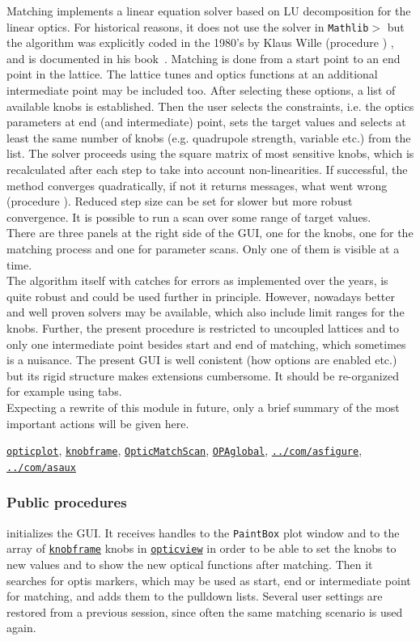 \documentclass[12pt]{article}
\newcommand\code[1]{{\tt #1}}
\newcommand\guico[1]{{\color{blue}\code{#1}}}
\newcommand{\unico}[1]{{\color{burntorange}\code{#1}}}
\newcommand{\prcod}[2]{\opauni{#1}$>$\unico{#2}}
\newcommand{\opagui}[1]{\colorbox{blue!20}{\code{#1}}}
\newcommand{\ogui}[1]{\hyperref[#1]{\opagui{#1}}}
\newcommand{\opaguif}[1]{\colorbox{violet!30}{\code{#1}}}
\newcommand{\oguif}[1]{\hyperref[#1]{\opaguif{#1}}}
\newcommand{\opauni}[1]{\colorbox{orange!30}{\code{#1}}}
\newcommand{\ouni}[1]{\hyperref[#1]{\opauni{#1}}}
\newcommand{\uses}[1]{\flushleft {\bf Uses:} #1}
\newcommand{\desc}[1]{#1}
\newcommand{\ppro}[1]{\subsubsection*{Public procedures} #1}
\newcommand{\todo}[1]{{\color{red} #1}}
\begin{document}
\desc{Matching implements a linear equation solver based on LU decomposition for the linear optics. For historical reasons, it does not use the solver in \prcod{Mathlib}{LUDCMP,LUBKSB} but the algorithm was explicitly coded in the 1980's by Klaus Wille (procedure \guico{Step}) , and is documented in his book~\cite{kwille}. Matching is done from a start point to an end point in the lattice. The lattice tunes and optics functions at an additional intermediate point may be included too.  After selecting these options, a list of available knobs is established. Then the user selects the constraints, i.e. the optics parameters at end (and intermediate) point, sets the target values and selects at least the same number of knobs (e.g. quadrupole strength, variable etc.) from the list. The solver proceeds using the square matrix of most sensitive knobs, which is recalculated after each step to take into account non-linearities. If successful, the method converges quadratically, if not it returns messages, what went wrong (procedure \guico{Term}). Reduced step size can be set for slower but more robust convergence. It is possible to run a scan over some range of target values. \\
There are three panels at the right side of the GUI, one for the knobs, one for the matching process and one for parameter scans. Only one of them is visible at a time.\\
\todo{The algorithm itself with catches for errors as implemented over the years, is quite robust and could be used further in principle. However, nowadays better and well proven solvers may be available, which also include limit ranges for the knobs. Further, the present procedure is restricted to uncoupled lattices and to only one intermediate point besides start and end of matching, which sometimes is a nuisance. The present GUI is well conistent (how options are enabled etc.) but its rigid structure makes extensions cumbersome. It should be re-organized for example using tabs.}\\
Expecting a rewrite of this module in future, only a brief summary of the most important actions will be given here.}

\uses{\ouni{opticplot}, \oguif{knobframe}, \ogui{OpticMatchScan}, \ouni{OPAglobal},  \oguif{../com/asfigure}, \ouni{../com/asaux}} 

\ppro{
\guico{Load} initializes the GUI. It receives handles to the \code{PaintBox} plot window and to the array of \oguif{knobframe} knobs in \ogui{opticview} in order to be able to set the knobs to new values and to show the new optical functions after matching. Then it searches for optis markers, which may be used as start, end or intermediate point for matching, and adds them to the \guico{ini/mat/midpoint} pulldown lists. Several user settings are restored from a previous session, since often the same matching scenario is used again.
}
\end{document}
